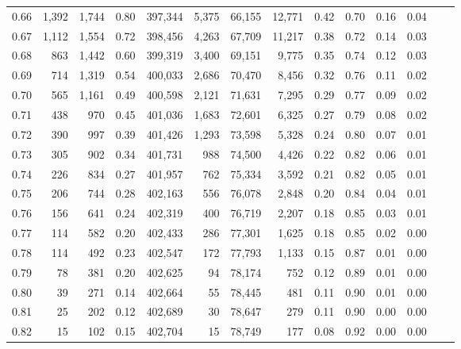 \begin{tabular}{rrrrrrrrrrrrrr}
0.66 &   1,392 &  1,744 &     0.80 &  397,344 &    5,375 &  66,155 &  12,771 &  0.42 &  0.70 &  0.16 &      0.04 \\
0.67 &   1,112 &  1,554 &     0.72 &  398,456 &    4,263 &  67,709 &  11,217 &  0.38 &  0.72 &  0.14 &      0.03 \\
0.68 &     863 &  1,442 &     0.60 &  399,319 &    3,400 &  69,151 &   9,775 &  0.35 &  0.74 &  0.12 &      0.03 \\
0.69 &     714 &  1,319 &     0.54 &  400,033 &    2,686 &  70,470 &   8,456 &  0.32 &  0.76 &  0.11 &      0.02 \\
0.70 &     565 &  1,161 &     0.49 &  400,598 &    2,121 &  71,631 &   7,295 &  0.29 &  0.77 &  0.09 &      0.02 \\
0.71 &     438 &    970 &     0.45 &  401,036 &    1,683 &  72,601 &   6,325 &  0.27 &  0.79 &  0.08 &      0.02 \\
0.72 &     390 &    997 &     0.39 &  401,426 &    1,293 &  73,598 &   5,328 &  0.24 &  0.80 &  0.07 &      0.01 \\
0.73 &     305 &    902 &     0.34 &  401,731 &      988 &  74,500 &   4,426 &  0.22 &  0.82 &  0.06 &      0.01 \\
0.74 &     226 &    834 &     0.27 &  401,957 &      762 &  75,334 &   3,592 &  0.21 &  0.82 &  0.05 &      0.01 \\
0.75 &     206 &    744 &     0.28 &  402,163 &      556 &  76,078 &   2,848 &  0.20 &  0.84 &  0.04 &      0.01 \\
0.76 &     156 &    641 &     0.24 &  402,319 &      400 &  76,719 &   2,207 &  0.18 &  0.85 &  0.03 &      0.01 \\
0.77 &     114 &    582 &     0.20 &  402,433 &      286 &  77,301 &   1,625 &  0.18 &  0.85 &  0.02 &      0.00 \\
0.78 &     114 &    492 &     0.23 &  402,547 &      172 &  77,793 &   1,133 &  0.15 &  0.87 &  0.01 &      0.00 \\
0.79 &      78 &    381 &     0.20 &  402,625 &       94 &  78,174 &     752 &  0.12 &  0.89 &  0.01 &      0.00 \\
0.80 &      39 &    271 &     0.14 &  402,664 &       55 &  78,445 &     481 &  0.11 &  0.90 &  0.01 &      0.00 \\
0.81 &      25 &    202 &     0.12 &  402,689 &       30 &  78,647 &     279 &  0.11 &  0.90 &  0.00 &      0.00 \\
0.82 &      15 &    102 &     0.15 &  402,704 &       15 &  78,749 &     177 &  0.08 &  0.92 &  0.00 &      0.00 \\

\end{tabular}

